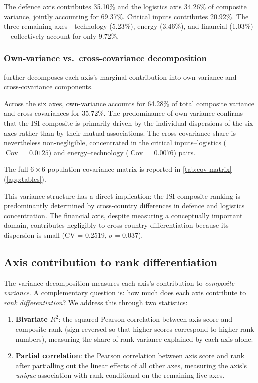 

The defence axis contributes 35.10\% and the logistics axis 34.26\%
of composite variance, jointly accounting for 69.37\%.  Critical
inputs contributes 20.92\%.  The three remaining axes---technology
(5.23\%), energy (3.46\%), and financial (1.03\%)---collectively
account for only 9.72\%.

\subsubsection{Own-variance vs.\ cross-covariance decomposition}

 further decomposes each axis's
marginal contribution into own-variance and cross-covariance
components.



Across the six axes, own-variance accounts for 64.28\% of total
composite variance and cross-covariances for 35.72\%.  The
predominance of own-variance confirms that the ISI composite is
primarily driven by the individual dispersions of the six axes rather
than by their mutual associations.  The cross-covariance share is
nevertheless non-negligible, concentrated in the critical
inputs--logistics ($\operatorname{Cov} = 0.0125$) and
energy--technology ($\operatorname{Cov} = 0.0076$) pairs.

The full $6 \times 6$ population covariance matrix is reported in
\cref{tab:cov-matrix} (\cref{app:tables}).

This variance structure has a direct implication: the ISI composite
ranking is predominantly determined by cross-country differences in
defence and logistics concentration.  The financial axis, despite
measuring a conceptually important domain, contributes negligibly to
cross-country differentiation because its dispersion is small (CV
= 0.2519, $\sigma = 0.037$).

\subsection{Axis contribution to rank differentiation}\label{sec:axis-rank}

The variance decomposition measures each axis's contribution to
\emph{composite variance}.  A complementary question is: how much
does each axis contribute to \emph{rank differentiation}?  We address
this through two statistics:

\begin{enumerate}[leftmargin=2em]
  \item \textbf{Bivariate $R^2$}: the squared Pearson correlation
    between axis score and composite rank (sign-reversed so that
    higher scores correspond to higher rank numbers), measuring the
    share of rank variance explained by each axis alone.
  \item \textbf{Partial correlation}: the Pearson correlation between
    axis score and rank after partialling out the linear effects of
    all other axes, measuring the axis's \emph{unique} association
    with rank conditional on the remaining five axes.
\end{enumerate}

